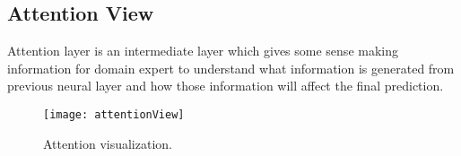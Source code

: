 \subsection{Attention View}
\label{sec:attention}
Attention layer is an intermediate layer which gives some sense making information for domain expert to understand what information is generated from previous neural layer and how those information will affect the final prediction.

\begin{figure*}[t]
\centering
\vspace{-2mm}
\texttt{[image: attentionView]}
\caption{
Attention visualization.
}
\label{fig:attentionVis}
\end{figure*}





